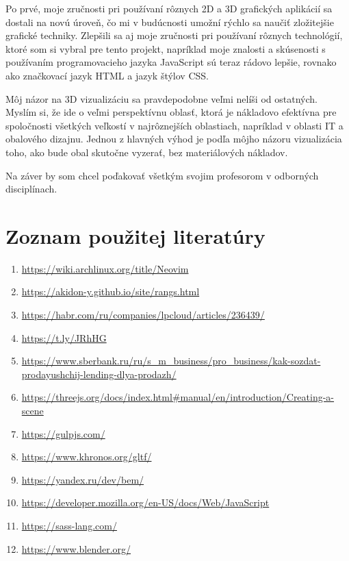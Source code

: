 Po prvé, moje zručnosti pri používaní rôznych 2D a 3D grafických aplikácií sa dostali na novú úroveň, čo mi v budúcnosti umožní rýchlo sa naučiť zložitejšie grafické techniky. Zlepšili sa aj moje zručnosti pri používaní rôznych technológií, ktoré som si vybral pre tento projekt, napríklad moje znalosti a skúsenosti s používaním programovacieho jazyka JavaScript sú teraz rádovo lepšie, rovnako ako značkovací jazyk HTML a jazyk štýlov CSS.

Môj názor na 3D vizualizáciu sa pravdepodobne veľmi nelíši od ostatných. Myslím si, že ide o veľmi perspektívnu oblasť, ktorá je nákladovo efektívna pre spoločnosti všetkých veľkostí v najrôznejších oblastiach, napríklad v oblasti IT a obalového dizajnu.  Jednou z hlavných výhod je podľa môjho názoru vizualizácia toho, ako bude obal skutočne vyzerať, bez materiálových nákladov.

Na záver by som chcel poďakovať všetkým svojim profesorom v odborných disciplínach.
  \newpage
  \section{Zoznam použitej literatúry}

    \begin{enumerate}
      \item{\url{https://wiki.archlinux.org/title/Neovim}}
      \item{\url{https://akidon-y.github.io/site/rangs.html}}
      \item{\url{https://habr.com/ru/companies/lpcloud/articles/236439/}}
      \item{\url{https://t.ly/JRhHG}}
      \item{\url{https://www.sberbank.ru/ru/s_m_business/pro_business/kak-sozdat-prodayushchij-lending-dlya-prodazh/}}
      \item{\url{https://threejs.org/docs/index.html#manual/en/introduction/Creating-a-scene}}
      \item{\url{https://gulpjs.com/}}
      \item{\url{https://www.khronos.org/gltf/}}
      \item{\url{https://yandex.ru/dev/bem/}}
      \item{\url{https://developer.mozilla.org/en-US/docs/Web/JavaScript}}
      \item{\url{https://sass-lang.com/}}
      \item{\url{https://www.blender.org/}}
    \end{enumerate}

